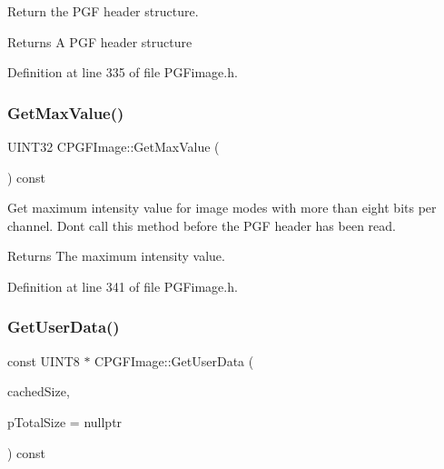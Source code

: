 Return the P\+GF header structure. \begin{DoxyReturn}{Returns}
A P\+GF header structure 
\end{DoxyReturn}


Definition at line 335 of file P\+G\+Fimage.\+h.


\begin{DoxyCode}{0}

\end{DoxyCode}
\mbox{\label{classCPGFImage_a205a92be52bd2047ade0398ed4bb2afb}} 
\subsubsection{\texorpdfstring{GetMaxValue()}{GetMaxValue()}}
{\footnotesize\ttfamily U\+I\+N\+T32 C\+P\+G\+F\+Image\+::\+Get\+Max\+Value (\begin{DoxyParamCaption}{ }\end{DoxyParamCaption}) const\hspace{0.3cm}{\ttfamily [inline]}}

Get maximum intensity value for image modes with more than eight bits per channel. Don\textquotesingle{}t call this method before the P\+GF header has been read. \begin{DoxyReturn}{Returns}
The maximum intensity value. 
\end{DoxyReturn}


Definition at line 341 of file P\+G\+Fimage.\+h.


\begin{DoxyCode}{0}

\end{DoxyCode}
\mbox{\label{classCPGFImage_aa7c092c2b27df184d7e81bef579e270c}} 
\subsubsection{\texorpdfstring{GetUserData()}{GetUserData()}}
{\footnotesize\ttfamily const U\+I\+N\+T8 $\ast$ C\+P\+G\+F\+Image\+::\+Get\+User\+Data (\begin{DoxyParamCaption}\item[{U\+I\+N\+T32 \&}]{cached\+Size,  }\item[{U\+I\+N\+T32 $\ast$}]{p\+Total\+Size = {\ttfamily nullptr} }\end{DoxyParamCaption}) const}

